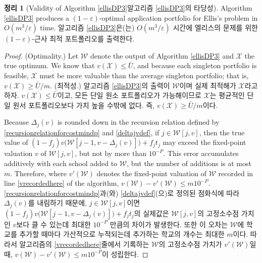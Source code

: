 \documentclass[11pt]{article} %
\newtheorem{theorem}{Theorem}
\theoremstyle{definition}
\newtheorem{theorem}{정리}
\theoremstyle{definition}
\begin{document}
\begin{theorem}[\ifen Validity of Algorithm \ref{ellisDP3}\else 알고리즘 \ref{ellisDP3}의 타당성\fi]
\ifen
Algorithm \ref{ellisDP3} produces a $(1 - \varepsilon)$-optimal application portfolio for Ellis's problem in $O(m^3 /\varepsilon)$ time. %
\else
알고리즘 \ref{ellisDP3}은(는) $O(m^3 /\varepsilon)$ 시간에 엘리스의 문제를 위한 $(1 - \varepsilon)$-근사 최적 포트폴리오를 출력한다.
\fi
\end{theorem}

\begin{proof}
\ifen
(Optimality.) Let $\mathcal{W}$ denote the output of Algorithm \ref{ellisDP3} and $\mathcal{X}$ the true optimum. We know that $v(\mathcal{X}) \leq \bar U$, and because each singleton portfolio is feasible, $\mathcal{X}$ must be more valuable than the average singleton portfolio; that is, $v(\mathcal{X}) \geq \bar U / m$.
\else
(최적성.) 알고리즘 \ref{ellisDP3}의 출력이 $\mathcal{W}$이며 실제 최적해가 $\mathcal{X}$라고 하자. $v(\mathcal{X}) \leq \bar U$이고, 모든 단일 원소 포트폴리오가 가능해이므로  $\mathcal{X}$는 평균적인 단일 원서 포트폴리오보다 가치 높을 수밖에 없다. 즉,  $v(\mathcal{X}) \geq \bar U / m$이다.
\fi

\ifen
Because $\Delta_j(v)$ is rounded down in the recursion relation defined by \eqref{recursionrelationforcostmindp} and \eqref{deltajvdef}, if $j \in \mathcal{W}[j, v]$, then the true value of $(1 - f_j) v\bigl(\mathcal{W}[j-1, v- \Delta_j(v)]\bigr) + f_j t_j$ may exceed the fixed-point valuation $v$ of $\mathcal{W}[j, v]$, but not by more than $10^{-P}$. This error accumulates additively with each school added to $\mathcal{W}$, but the number of additions is at most $m$. Therefore, where $v'(\mathcal{W})$ denotes the fixed-point valuation of $\mathcal{W}$ recorded in line \ref{vrecordedhere} of the algorithm, 
$v(\mathcal{W}) - v'(\mathcal{W}) \leq m 10^{-P}$.
\else
\eqref{recursionrelationforcostmindp}과(와) \eqref{deltajvdef}(으)로 정의된 점화식에 따라 $\Delta_j(v)$를 내림하기 때문에, $j \in \mathcal{W}[j, v]$이면 $(1 - f_j) v\bigl(\mathcal{W}[j-1, v- \Delta_j(v)]\bigr) + f_j t_j$의 실제값은 $\mathcal{W}[j, v]$의 고정소수점 가치인 $v$보다 클 수 있는데 최대한 $10^{-P}$ 만큼의 차이가 발생한다. 또한 이 오차는 $\mathcal{W}$에 학교를 추가할 때마다 가산적으로 누적되는데 추가하는 학교의 개수는 최대한 $m$이다. 따라서 알고리즘의 \ref{vrecordedhere}줄에서 기록하는 $\mathcal{W}$의 고정소수점 가치가 $v'(\mathcal{W})$일 때, $v(\mathcal{W}) - v'(\mathcal{W}) \leq m 10^{-P}$이 성립한다.
\fi


\end{proof}
\end{document}
